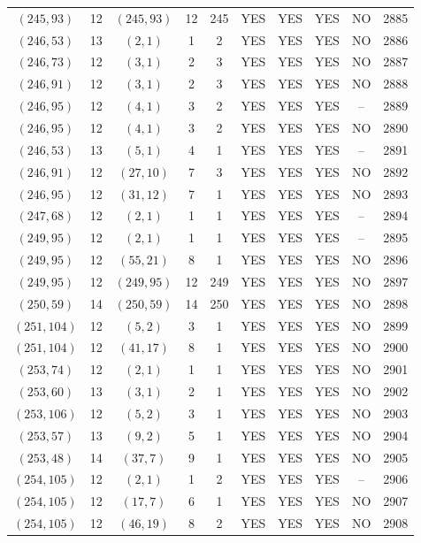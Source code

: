 \begin{longtable}{|c|c|c|c|c|c|c|c|c|c|}
$(245, 93)$ & 12 & $(245, 93)$ & 12 & 245 & YES & YES & YES & NO & 2885\\
$(246, 53)$ & 13 & $(2, 1)$ & 1 & 2 & YES & YES & YES & NO & 2886\\
$(246, 73)$ & 12 & $(3, 1)$ & 2 & 3 & YES & YES & YES & NO & 2887\\
$(246, 91)$ & 12 & $(3, 1)$ & 2 & 3 & YES & YES & YES & NO & 2888\\
$(246, 95)$ & 12 & $(4, 1)$ & 3 & 2 & YES & YES & YES & -- & 2889\\
$(246, 95)$ & 12 & $(4, 1)$ & 3 & 2 & YES & YES & YES & NO & 2890\\
$(246, 53)$ & 13 & $(5, 1)$ & 4 & 1 & YES & YES & YES & -- & 2891\\
$(246, 91)$ & 12 & $(27, 10)$ & 7 & 3 & YES & YES & YES & NO & 2892\\
$(246, 95)$ & 12 & $(31, 12)$ & 7 & 1 & YES & YES & YES & NO & 2893\\
$(247, 68)$ & 12 & $(2, 1)$ & 1 & 1 & YES & YES & YES & -- & 2894\\
$(249, 95)$ & 12 & $(2, 1)$ & 1 & 1 & YES & YES & YES & -- & 2895\\
$(249, 95)$ & 12 & $(55, 21)$ & 8 & 1 & YES & YES & YES & NO & 2896\\
$(249, 95)$ & 12 & $(249, 95)$ & 12 & 249 & YES & YES & YES & NO & 2897\\
$(250, 59)$ & 14 & $(250, 59)$ & 14 & 250 & YES & YES & YES & NO & 2898\\
$(251, 104)$ & 12 & $(5, 2)$ & 3 & 1 & YES & YES & YES & NO & 2899\\
$(251, 104)$ & 12 & $(41, 17)$ & 8 & 1 & YES & YES & YES & NO & 2900\\
$(253, 74)$ & 12 & $(2, 1)$ & 1 & 1 & YES & YES & YES & NO & 2901\\
$(253, 60)$ & 13 & $(3, 1)$ & 2 & 1 & YES & YES & YES & NO & 2902\\
$(253, 106)$ & 12 & $(5, 2)$ & 3 & 1 & YES & YES & YES & NO & 2903\\
$(253, 57)$ & 13 & $(9, 2)$ & 5 & 1 & YES & YES & YES & NO & 2904\\
$(253, 48)$ & 14 & $(37, 7)$ & 9 & 1 & YES & YES & YES & NO & 2905\\
$(254, 105)$ & 12 & $(2, 1)$ & 1 & 2 & YES & YES & YES & -- & 2906\\
$(254, 105)$ & 12 & $(17, 7)$ & 6 & 1 & YES & YES & YES & NO & 2907\\
$(254, 105)$ & 12 & $(46, 19)$ & 8 & 2 & YES & YES & YES & NO & 2908\\

\end{longtable}
